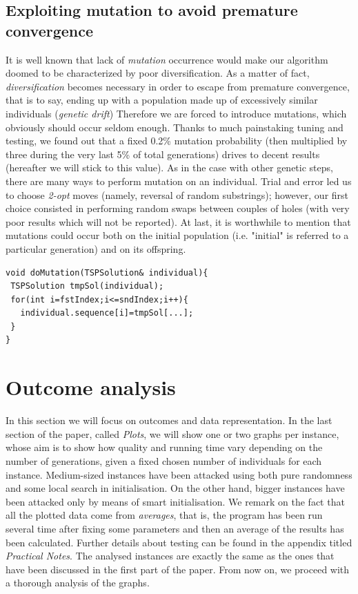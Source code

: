 \documentclass[letterpaper, 10 pt, conference]{ieeeconf}  %
\begin{document}
\subsection{Exploiting mutation to avoid premature convergence}
It is well known that lack of \textit{mutation} occurrence would make our algorithm doomed to be characterized by poor diversification. As a matter of fact, \textit{diversification} becomes necessary in order to escape from premature convergence, that is to say, ending up with a population made up of excessively similar individuals (\textit{genetic drift}) \newline
Therefore we are forced to introduce mutations, which obviously should occur seldom enough. Thanks to much painstaking tuning and testing, we found out that a fixed 0.2\% mutation probability (then multiplied by three during the very last 5\% of total generations) drives to decent results (hereafter we will stick to this value). \newline
As in the case with other genetic steps, there are many ways to perform mutation on an individual. Trial and error led us to choose \textit{2-opt} moves (namely, reversal of random substrings); however, our first choice consisted in performing random swaps between couples of holes (with very poor results which will not be reported). \newline
At last, it is worthwhile to mention that mutations could occur both on the initial population (i.e. "initial" is referred to a particular generation) and on its offspring.
\begin{lstlisting}[caption={2-opt move, in \texttt{TSPCrossover.h}}]
void doMutation(TSPSolution& individual){
 TSPSolution tmpSol(individual);
 for(int i=fstIndex;i<=sndIndex;i++){
   individual.sequence[i]=tmpSol[...];
 }
}
\end{lstlisting}

\section{Outcome analysis}
In this section we will focus on outcomes and data representation. In the last section of the paper, called \textit{Plots}, we will show one or two graphs per instance, whose aim is to show how quality and running time vary depending on the number of generations, given a fixed chosen number of individuals for each instance. Medium-sized instances have been attacked using both pure randomness and some local search in initialisation. On the other hand, bigger instances have been attacked only by means of smart initialisation. \newline 
We remark on the fact that all the plotted data come from \textit{averages}, that is, the program has been run several time
after fixing some parameters and then an average of the results has been calculated. Further details about testing can be found in the appendix titled \textit{Practical Notes}. \newline
The analysed instances are exactly the same as the ones that
have been discussed in the first part of the paper. \newline
From now on, we proceed with a thorough analysis of the graphs.
\end{document}
